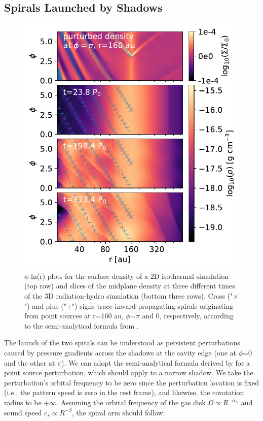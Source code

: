 \documentclass[twocolumn,tighten]{aastex631}
\begin{document}
\subsection{Spirals Launched by Shadows}
\begin{figure}
\includegraphics[width=\linewidth]{Figure2.pdf}
\caption{$\phi$-ln(r) plots for the surface density of a 2D isothermal simulation (top row) and slices of the midplane density at three different times of the 3D radiation-hydro simulation (bottom three rows). Cross ("$\times$") and plus ("+") signs trace inward-propagating spirals originating from point sources at r=160 au, $\phi$=$\pi$ and 0, respectively, according to the semi-analytical formula from \citet{zhu22}.}
\label{fig:2}
\end{figure}

The launch of the two spirals can be understood as persistent perturbations caused by pressure gradients across the shadows at the cavity edge (one at $\phi$=0 and the other at $\pi$). We can adopt the semi-analytical formula derived by \citet{zhu22} for a point source perturbation, which should apply to a narrow shadow. We take the perturbation's orbital frequency to be zero since the perturbation location is fixed (i.e., the pattern speed is zero in the rest frame), and likewise, the corotation radius to be +$\infty$. Assuming the orbital frequency of the gas disk $\Omega \propto R^{-\alpha_\Omega}$ and sound speed $c_s \propto R^{-\beta}$, the spiral arm should follow:
\end{document}
